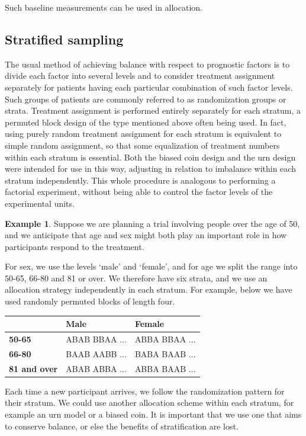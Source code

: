 \documentclass[
  openany]{book}
\theoremstyle{definition}
\theoremstyle{definition}
\newtheorem{example}{Example}[chapter]
\theoremstyle{definition}
\theoremstyle{definition}
\theoremstyle{remark}
\begin{document}
Such baseline measurements can be used in allocation.

\subsection{Stratified sampling}\label{stratified-sampling}

The usual method of achieving balance with respect to prognostic factors is to divide each factor into several levels and to consider treatment assignment separately for patients having each particular combination of such factor levels. Such groups of patients are commonly referred to as randomization groups or strata. Treatment assignment is performed entirely separately for each stratum, a permuted block design of the type mentioned above often being used. In fact, using purely random treatment assignment for each stratum is equivalent to simple random assignment, so that some equalization of treatment numbers within each stratum is essential. Both the biased coin design and the urn design were intended for use in this way, adjusting in relation to imbalance within each stratum independently. This whole procedure is analogous to performing a factorial experiment, without being able to control the factor levels of the experimental units.

\begin{example}
Suppose we are planning a trial involving people over the age of 50, and we anticipate that age and sex might both play an important role in how participants respond to the treatment.

For sex, we use the levels `male' and `female', and for age we split the range into 50-65, 66-80 and 81 or over. We therefore have six strata, and we use an allocation strategy independently in each stratum. For example, below we have used randomly permuted blocks of length four.

\begin{tabular}{>{}l|l|l}
\hline
  & Male & Female\\
\hline
\textbf{50-65} & ABAB BBAA ... & ABBA BBAA ...\\
\hline
\textbf{66-80} & BAAB AABB ... & BABA BAAB ...\\
\hline
\textbf{81 and over} & ABAB ABBA ... & ABBA BAAB ...\\
\hline
\end{tabular}

Each time a new participant arrives, we follow the randomization pattern for their stratum. We could use another allocation scheme within each stratum, for example an urn model or a biased coin. It is important that we use one that aims to conserve balance, or else the benefits of stratification are lost.
\end{example}
\end{document}

